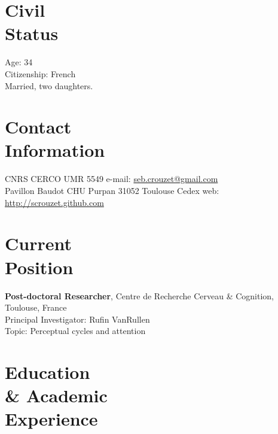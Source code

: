 \documentclass[margin,line]{resume}
\begin{document}
\begin{resume}

    \section{\mysidestyle Civil\\Status}
    Age: 34\\
    Citizenship: French\\
    Married, two daughters.
    \vspace{3mm}
 

    \section{\mysidestyle Contact\\Information}
    CNRS CERCO UMR 5549             \hfill e-mail: \href{mailto:seb.crouzet@gmail.com}{seb.crouzet@gmail.com} \\
    Pavillon Baudot CHU Purpan 31052 Toulouse Cedex      \hfill web: \url{http://scrouzet.github.com} 
    
	
    \vspace{3mm}
    \section{\mysidestyle Current\\Position}
    \textbf{Post-doctoral Researcher}, Centre de Recherche Cerveau \& Cognition, Toulouse, France\\
    Principal Investigator: Rufin VanRullen\\
    Topic: Perceptual cycles and attention 

    \vspace{3mm}
    \section{\mysidestyle Education \\ \& Academic \\ Experience }
    

\end{resume}
\end{document}
